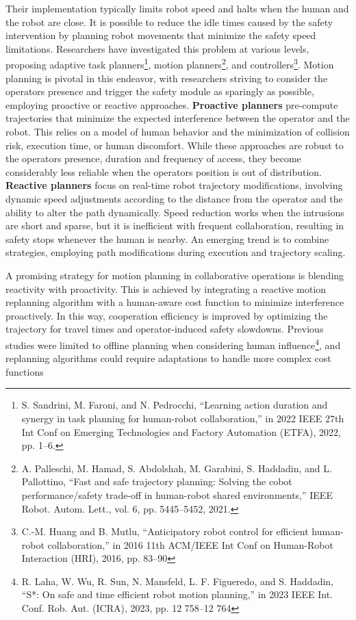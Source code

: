 Their implementation typically limits robot speed and halts when the
human and the robot are close. It is possible to reduce the idle times
caused by the safety intervention by planning robot movements that
minimize the safety speed limitations. Researchers have investigated
this problem at various levels, proposing adaptive task
planners\footnote{S. Sandrini, M. Faroni, and N. Pedrocchi, ``Learning
  action duration and synergy in task planning for human-robot
  collaboration,'' in 2022 IEEE 27th Int Conf on Emerging Technologies
  and Factory Automation (ETFA), 2022, pp. 1--6.}, motion
planners\footnote{A. Palleschi, M. Hamad, S. Abdolshah, M. Garabini, S.
  Haddadin, and L. Pallottino, ``Fast and safe trajectory planning:
  Solving the cobot performance/safety trade-off in human-robot shared
  environments,'' IEEE Robot. Autom. Lett., vol. 6, pp. 5445--5452,
  2021.}, and controllers\footnote{C.-M. Huang and B. Mutlu,
  ``Anticipatory robot control for efficient human-robot
  collaboration,'' in 2016 11th ACM/IEEE Int Conf on Human-Robot
  Interaction (HRI), 2016, pp. 83--90}. Motion planning is pivotal in
this endeavor, with researchers striving to consider the
operator\textquotesingle s presence and trigger the safety module as
sparingly as possible, employing proactive or reactive approaches.
\textbf{Proactive planners} pre-compute trajectories that minimize the
expected interference between the operator and the robot. This relies on
a model of human behavior and the minimization of collision risk,
execution time, or human discomfort. While these approaches are robust
to the operator\textquotesingle s presence, duration and frequency of
access, they become considerably less reliable when the
operator\textquotesingle s position is out of distribution.
\textbf{Reactive planners} focus on real-time robot trajectory
modifications, involving dynamic speed adjustments according to the
distance from the operator and the ability to alter the path
dynamically. Speed reduction works when the intrusions are short and
sparse, but it is inefficient with frequent collaboration, resulting in
safety stops whenever the human is nearby. An emerging trend is to
combine strategies, employing path modifications during execution and
trajectory scaling.

A promising strategy for motion planning in collaborative operations is
blending reactivity with proactivity. This is achieved by integrating a
reactive motion replanning algorithm with a human-aware cost function to
minimize interference proactively. In this way, cooperation efficiency
is improved by optimizing the trajectory for travel times and
operator-induced safety slowdowns. Previous studies were limited to
offline planning when considering human influence\footnote{R. Laha, W.
  Wu, R. Sun, N. Mansfeld, L. F. Figueredo, and S. Haddadin, ``S*: On
  safe and time efficient robot motion planning,'' in 2023 IEEE Int.
  Conf. Rob. Aut. (ICRA), 2023, pp. 12 758--12 764}, and replanning
algorithms could require adaptations to handle more complex cost
functions

